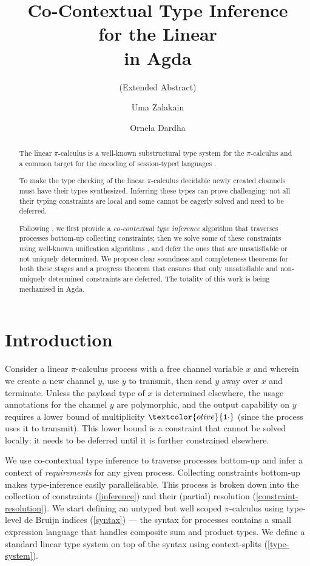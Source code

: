 \documentclass[sigplan,screen,review]{acmart}
\title
[Co-Contextual Type Inference for the Linear \Picalc{} in Agda]
{Co-Contextual Type Inference \\ for the Linear \Picalc{} \\ in Agda}
\subtitle{(Extended Abstract)}
\author{Uma Zalakain}
\affiliation{University of Glasgow}
\author{Ornela Dardha}
\affiliation{University of Glasgow}
\newcommand{\picalc}{$\pi$-calculus}
\newcommand{\constr}[1]{\textcolor{olive}{\mathtt{#1}}}
\newcommand{\tone}{\constr{1\cdot}}
\begin{document}
\begin{abstract}
  The linear \picalc{} is a well-known substructural type system for the \picalc{} and a common target for the encoding of session-typed languages \cite{DardhaGS17}.

  To make the type checking of the linear \picalc{} decidable newly created channels must have their types synthesized.
  Inferring these types can prove challenging: not all their typing constraints are local and some cannot be eagerly solved and need to be deferred.

  Following \cite{Padovani15}, we first provide a \emph{co-contextual type inference} \cite{ErdwegBKKM15} algorithm that traverses processes bottom-up collecting constraints; then we solve some of these constraints using well-known unification algorithms \cite{McBride03}, and defer the ones that are unsatisfiable or not uniquely determined.
  We propose clear soundness and completeness theorems for both these stages and a progress theorem that ensures that only unsatisfiable and non-uniquely determined constraints are deferred.
  The totality of this work is being mechanised in Agda.
\end{abstract}


\maketitle

\section{Introduction}\label{introduction}

Consider a linear \picalc{} process with a free channel variable $x$ and wherein we create a new channel $y$, use $y$ to transmit, then send $y$ away over $x$ and terminate.
Unless the payload type of $x$ is determined elsewhere, the usage annotations for the channel $y$ are polymorphic, and the output capability on $y$ requires a lower bound of multiplicity $\tone$ (since the process uses it to transmit).
This lower bound is a constraint that cannot be solved locally: it needs to be deferred until it is further constrained elsewhere.

We use co-contextual type inference \cite{ErdwegBKKM15} to traverse processes bottom-up and infer a context of \emph{requirements} for any given process.
Collecting constraints bottom-up makes type-inference easily parallelisable.
This process is broken down into the collection of constraints (\autoref{inference}) and their (partial) resolution (\autoref{constraint-resolution}).
We start defining an untyped but well scoped \picalc{} using type-level de Bruijn \cite{deBruijn72} indices (\autoref{syntax}) --- the syntax for processes contains a small expression language that handles composite sum and product types.
We define a standard linear type system on top of the syntax using context-splits (\autoref{type-system}).
\end{document}
